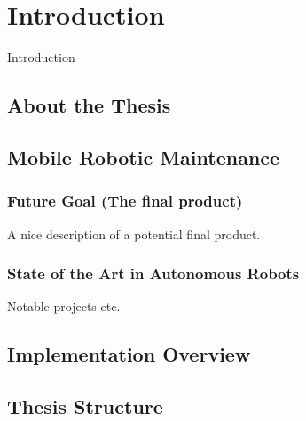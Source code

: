 \chapter{Introduction}
\label{chp:introduction} 

Introduction
\section{About the Thesis}

\section{Mobile Robotic Maintenance}

\subsection{Future Goal (The final product)}
A nice description of a potential final product.

\subsection{State of the Art in Autonomous Robots}
Notable projects etc.

\section{Implementation Overview}

\section{Thesis Structure}